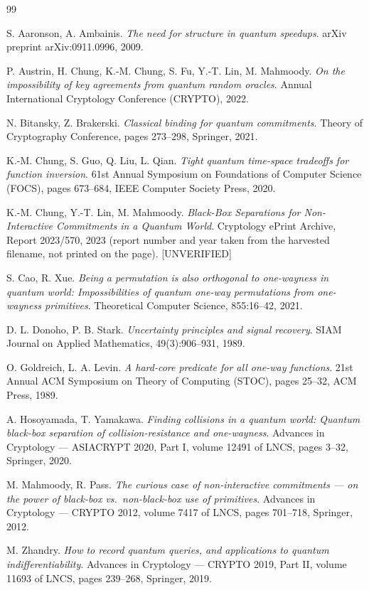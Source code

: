 \documentclass{aicr-conjecture}
\begin{document}
\begin{aicrbibliography}{99}

S. Aaronson, A. Ambainis.
\emph{The need for structure in quantum speedups}.
arXiv preprint arXiv:0911.0996, 2009.

P. Austrin, H. Chung, K.-M. Chung, S. Fu, Y.-T. Lin, M. Mahmoody.
\emph{On the impossibility of key agreements from quantum random
oracles}.
Annual International Cryptology Conference (CRYPTO), 2022.

N. Bitansky, Z. Brakerski.
\emph{Classical binding for quantum commitments}.
Theory of Cryptography Conference, pages 273--298, Springer, 2021.

K.-M. Chung, S. Guo, Q. Liu, L. Qian.
\emph{Tight quantum time-space tradeoffs for function inversion}.
61st Annual Symposium on Foundations of Computer Science (FOCS), pages
673--684, IEEE Computer Society Press, 2020.

K.-M. Chung, Y.-T. Lin, M. Mahmoody.
\emph{Black-Box Separations for Non-Interactive Commitments in a Quantum
World}.
Cryptology ePrint Archive, Report 2023/570, 2023 (report number and year
taken from the harvested filename, not printed on the page). [UNVERIFIED]

S. Cao, R. Xue.
\emph{Being a permutation is also orthogonal to one-wayness in quantum
world: Impossibilities of quantum one-way permutations from one-wayness
primitives}.
Theoretical Computer Science, 855:16--42, 2021.

D. L. Donoho, P. B. Stark.
\emph{Uncertainty principles and signal recovery}.
SIAM Journal on Applied Mathematics, 49(3):906--931, 1989.

O. Goldreich, L. A. Levin.
\emph{A hard-core predicate for all one-way functions}.
21st Annual ACM Symposium on Theory of Computing (STOC), pages 25--32,
ACM Press, 1989.

A. Hosoyamada, T. Yamakawa.
\emph{Finding collisions in a quantum world: Quantum black-box
separation of collision-resistance and one-wayness}.
Advances in Cryptology --- ASIACRYPT 2020, Part I, volume 12491 of LNCS,
pages 3--32, Springer, 2020.

M. Mahmoody, R. Pass.
\emph{The curious case of non-interactive commitments --- on the power of
black-box vs.\ non-black-box use of primitives}.
Advances in Cryptology --- CRYPTO 2012, volume 7417 of LNCS, pages
701--718, Springer, 2012.

M. Zhandry.
\emph{How to record quantum queries, and applications to quantum
indifferentiability}.
Advances in Cryptology --- CRYPTO 2019, Part II, volume 11693 of LNCS,
pages 239--268, Springer, 2019.

\end{aicrbibliography}
\end{document}
